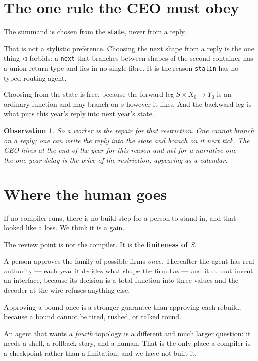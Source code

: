 \documentclass[11pt,a4paper]{article}
\newtheorem*{obs}{Observation}
\begin{document}
\section{The one rule the CEO must obey}

The summand is chosen from the \textbf{state}, never from a reply.

That is not a stylistic preference. Choosing the next shape from a reply is the
one thing $\triangleleft$ forbids: a \texttt{next} that branches between shapes
of the second container has a union return type and lies in no single fibre. It
is the reason \texttt{stalin} has no typed routing agent.

Choosing from the state is free, because the forward leg $S \times X_0 \to Y_0$
is an ordinary function and may branch on $s$ however it likes. And the backward
leg is what puts this year's reply into next year's state.

\begin{obs}
So a worker is the repair for that restriction. One cannot branch on a reply;
one can write the reply into the state and branch on it next tick. The CEO hires
at the \emph{end} of the year for this reason and not for a narrative one --- the
one-year delay is the price of the restriction, appearing as a calendar.
\end{obs}

\section{Where the human goes}

If no compiler runs, there is no build step for a person to stand in, and that
looked like a loss. We think it is a gain.

\begin{sectionbox}
The review point is not the compiler. It is the \textbf{finiteness of $S$}.

A person approves the family of possible firms \emph{once}. Thereafter the agent
has real authority --- each year it decides what shape the firm has --- and it
cannot invent an interface, because its decision is a total function into three
values and the decoder at the wire refuses anything else.

Approving a bound once is a stronger guarantee than approving each rebuild,
because a bound cannot be tired, rushed, or talked round.
\end{sectionbox}

An agent that wants a \emph{fourth} topology is a different and much larger
question: it needs a shell, a rollback story, and a human. That is the only
place a compiler is a checkpoint rather than a limitation, and we have not built
it.
\end{document}
